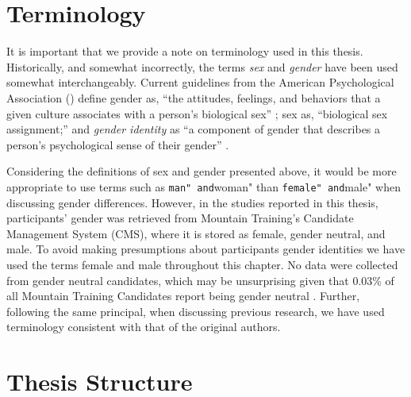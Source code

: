 \documentclass[
  12pt,
  a4paper,
]{book}
\begin{document}
\hypertarget{terminology}{%
\section{Terminology}\label{terminology}}

It is important that we provide a note on terminology used in this thesis. Historically, and somewhat incorrectly, the terms \textit{sex} and \textit{gender} have been used somewhat interchangeably. Current guidelines from the American Psychological Association (\citeyear[][]{APA2020}) define gender as, ``the attitudes, feelings, and behaviors that a given culture associates with a person's biological sex'' \citep[][p 12]{APA2012}; sex as, ``biological sex assignment;'' and \textit{gender identity} as ``a component of gender that describes a person's psychological sense of their gender'' \citep[][Section 5.5]{APA2020}.

Considering the definitions of sex and gender presented above, it would be more appropriate to use terms such as \texttt{man"\ and}woman" than \texttt{female"\ and}male" when discussing gender differences. However, in the studies reported in this thesis, participants' gender was retrieved from Mountain Training's Candidate Management System (CMS), where it is stored as female, gender neutral, and male. To avoid making presumptions about participants gender identities we have used the terms female and male throughout this chapter. No data were collected from gender neutral candidates, which may be unsurprising given that 0.03\% of all Mountain Training Candidates report being gender neutral \citep{MountainTrainingUK2019a}. Further, following the same principal, when discussing previous research, we have used terminology consistent with that of the original authors.

\hypertarget{thesis-structure}{%
\section{Thesis Structure}\label{thesis-structure}}
\end{document}
